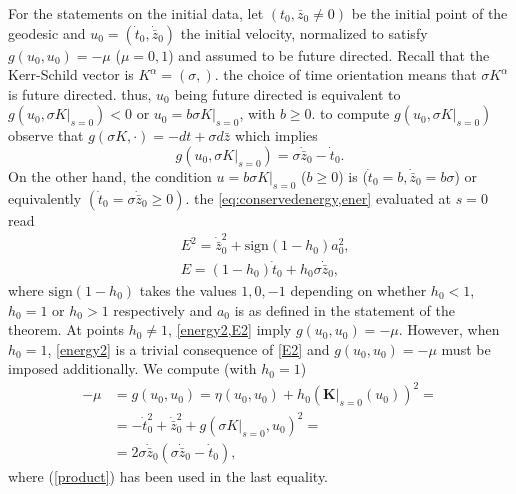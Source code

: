 \begin{Proof}
 For the statements on the initial data, 
let $( t_0, {\bar z}_0 \neq 0)$ be the initial point of the geodesic
and $u_0 = (\dot{t}_0, \dot{{\bar z}}_0)$ the initial velocity, 
normalized to satisfy $g(u_0,u_0) = -\mu$ ($\mu = 0,1$) and assumed
to be future directed. 
Recall that the Kerr-Schild vector is $K^{\alpha} = (\sigma, 
)$. the choice of time orientation means
that $\sigma K^{\alpha}$ is future directed. thus,
$u_0$ being future directed is equivalent to 
$g(u_0, \sigma K |_{s=0}) <0$ or $u_0 = b \sigma K|_{s=0}$, with $b \geq 0$. 
to compute $g(u_0, \sigma K|_{s=0})$ observe that $g(\sigma K, \cdot ) =
 -  dt +  \sigma d {\bar z}$ which implies
\begin{equation}
\label{product}
g(u_0, \sigma K|_{s=0} ) =  \sigma \dot{{\bar z}}_0 - \dot{t}_0 .
\end{equation}
On the other hand, the condition $u= b \sigma K|_{s=0}$ ($b \geq 0$)
is ($\dot{t}_0 = b, \dot{{\bar z}}_0 = b \sigma $)
or equivalently $(\dot{t}_0 = \sigma  \dot{{\bar z}}_0  \geq 0)$. 
the \cref{eq:conservedenergy,ener} evaluated at $s=0$ read
\begin{align}
& E^2 = \dot{{\bar z}}^2_0 + \mbox{sign}(1- h_0) a_0^2, \label{energy2} \\
& E  = \left ( 1-  h_0  \right ) \dot{t}_0 + h_0  \sigma \dot{{\bar z}}_0, \label{E2}
\end{align}
where $\mbox{sign} (1- h_0)$ takes the values $1,0,-1$ depending
on whether $ h_0 < 1$, $ h_0=1$ or $ h_0>1$ respectively
and $a_0$ is as defined in the statement of the theorem.
At points $ h_0 \neq 1$, \cref{energy2,E2} imply $g(u_0,u_0) = -\mu$.
However, when $ h_0=1$, 
\cref{energy2} is a trivial consequence
of \cref{E2} and $g(u_0,u_0)= - \mu$ must be imposed 
additionally. We compute (with $ h_0=1$)
\begin{align}
-\mu & = g (u_0,u_0) = \eta(u_0,u_0) + h_0 \left ( \bm{K} |_{s=0} (u_0) \right 
)^2 =\nonumber\\\
&= - \dot{t}_0^2 + \dot{{\bar z}}_0^2 + g(\sigma K|_{s=0},u_0)^2 = \nonumber \\
& = 2 \sigma \dot{{\bar z}}_0 \left ( \sigma \dot{{\bar z}}_0 -  \dot{t}_0 \right ) ,
\label{caseh0=1}
\end{align}
where (\ref{product}) has been used in the last equality.


\end{Proof}
